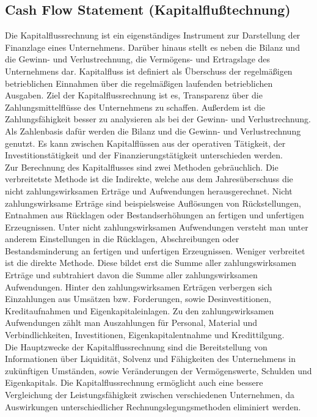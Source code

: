 \subsection{Cash Flow Statement (Kapitalflußtechnung)}
Die Kapitalflussrechnung ist ein eigenständiges Instrument zur Darstellung der Finanzlage eines Unternehmens. Darüber hinaus stellt es neben die Bilanz und die Gewinn- und Verlustrechnung, die Vermögens- und Ertragslage des Unternehmens dar. \cite{coenenberg2001kapitalflussrechnung} Kapitalfluss ist definiert als  Überschuss der regelmäßigen betrieblichen Einnahmen über die  regelmäßigen laufenden betrieblichen Ausgaben. Ziel der Kapitalflussrechnung ist es, Transparenz über die Zahlungsmittelflüsse des Unternehmens zu schaffen. Außerdem ist die Zahlungsfähigkeit besser zu analysieren als bei der Gewinn- und Verlustrechnung. Als Zahlenbasis dafür werden die Bilanz und die Gewinn- und Verlustrechnung genutzt. Es kann zwischen Kapitalflüssen aus der operativen Tätigkeit,  der Investitionstätigkeit und der Finanzierungstätigkeit  unterschieden werden. \cite{kapitalfluss}
\\ Zur Berechnung des Kapitalflusses sind zwei Methoden gebräuchlich. Die verbreitetste Methode ist die Indirekte, welche aus dem Jahresüberschuss die nicht zahlungswirksamen Erträge und Aufwendungen herausgerechnet. Nicht zahlungswirksame Erträge sind beispielsweise Auflösungen von Rückstellungen, Entnahmen aus Rücklagen oder Bestandserhöhungen an fertigen und unfertigen Erzeugnissen. Unter nicht zahlungswirksamen Aufwendungen versteht man unter anderem Einstellungen in die Rücklagen, Abschreibungen oder Bestandsminderung an fertigen und unfertigen Erzeugnissen. Weniger verbreitet ist die direkte Methode. Diese bildet erst die Summe aller zahlungswirksamen Erträge und subtrahiert davon die Summe aller zahlungswirksamen Aufwendungen. Hinter den zahlungswirksamen Erträgen verbergen sich Einzahlungen aus Umsätzen bzw. Forderungen, sowie Desinvestitionen, Kreditaufnahmen und Eigenkapitaleinlagen. Zu den zahlungswirksamen Aufwendungen zählt man Auszahlungen für Personal, Material und Verbindlichkeiten, Investitionen, Eigenkapitalentnahme und Kredittilgung.\cite{cashflow}
\\
Die Hauptzwecke der Kapitalflussrechnung sind die Bereitstellung von Informationen über Liquidität, Solvenz und Fähigkeiten des Unternehmens in zukünftigen Umständen, sowie Veränderungen der Vermögenswerte, Schulden und Eigenkapitals. Die Kapitalflussrechnung ermöglicht auch eine bessere Vergleichung der Leistungsfähigkeit zwischen verschiedenen Unternehmen,  da Auswirkungen unterschiedlicher Rechnungslegungsmethoden eliminiert werden. \cite{coenenberg2001kapitalflussrechnung}
